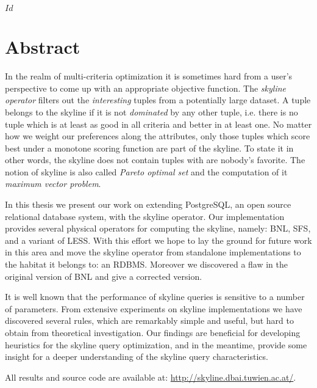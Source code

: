 
\svnInfo $Id$


\chapter*{Abstract\revision}


In the realm of multi-criteria optimization it is sometimes hard from
a user's perspective to come up with an appropriate objective
function.
%
The \emph{skyline operator} filters out the \emph{interesting} tuples
from a potentially large dataset.  A tuple belongs to the skyline if
it is not \emph{dominated} by any other tuple, i.e. there is no tuple
which is at least as good in all criteria and better in at least one.
%
No matter how we weight our preferences along the attributes, only
those tuples which score best under a monotone scoring function are
part of the skyline.
%
To state it in other words, the skyline does not contain tuples with
are nobody's favorite.
%
The notion of skyline is also called \emph{Pareto optimal set} and the
computation of it \emph{maximum vector problem}.


In this thesis we present our work on extending PostgreSQL, an open
source relational database system, with the skyline operator.
%
Our implementation provides several physical operators for computing
the skyline, namely: BNL, SFS, and a variant of LESS.
%
With this effort we hope to lay the ground for future work in this
area and move the skyline operator from standalone implementations to
the habitat it belongs to: an RDBMS.
%
Moreover we discovered a flaw in the original version of BNL and give
a corrected version.

It is well known that the performance of skyline queries is sensitive
to a number of parameters.  
%
From extensive experiments on skyline implementations we have
discovered several rules, which are remarkably simple and useful, but
hard to obtain from theoretical investigation.
%
Our findings are beneficial for developing heuristics for the skyline
query optimization, and in the meantime, provide some insight for a
deeper understanding of the skyline query characteristics.

All results and source code are available at:
\url{http://skyline.dbai.tuwien.ac.at/}.
